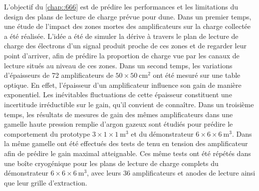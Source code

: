 L'objectif du \autoref{chap::666} est de prédire les performances et les limitations du design des plans de lecture de charge prévue pour \gls{dune}. Dans un premier temps, une étude de l'impact des zones mortes des amplificateurs sur la charge collectée a été réalisée. L'idée a été de simuler la dérive à travers le plan de lecture de charge des électrons d'un signal produit proche de ces zones et de regarder leur point d'arriver, afin de prédire la proportion de charge vue par les canaux de lecture situés au niveau de ces zones. Dans un second temps, les variations d'épaisseurs de 72 amplificateurs de $50\times\SI{50}{\centi\meter\squared}$ ont été mesuré sur une table optique. En effet, l'épaisseur d'un amplificateur influence son gain de manière exponentiel. Les inévitables fluctuations de cette épaisseur constituent une incertitude irréductible sur le gain, qu'il convient de connaître.  Dans un troisième temps, les résultats de mesures de gain des mêmes amplificateurs dans une gamelle haute pression remplie d'argon gazeux sont étudiés pour prédire le comportement  du prototype $3\times1\times\SI{1}{\meter^3}$ et du démonstrateur $6\times6\times\SI{6}{\meter^3}$.  Dans la même gamelle ont été effectués des tests de tenu en tension des amplificateur afin de prédire le gain maximal atteignable. Ces même tests ont été répétés dans une boîte cryogénique pour les plans de lecture de charge complets du démonstrateur $6\times6\times\SI{6}{\meter^3}$, avec leurs 36 amplificateurs et anodes de lecture ainsi que leur grille d'extraction.

